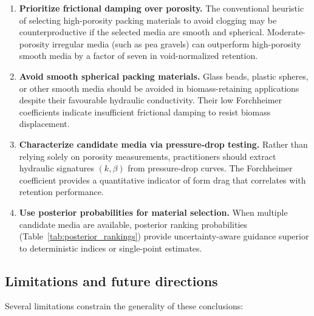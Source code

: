 \documentclass[12pt,a4paper]{article}
\begin{document}
\begin{enumerate}
    \item \textbf{Prioritize frictional damping over porosity.} The conventional heuristic of selecting high-porosity packing materials to avoid clogging may be counterproductive if the selected media are smooth and spherical. Moderate-porosity irregular media (such as pea gravels) can outperform high-porosity smooth media by a factor of seven in void-normalized retention.

    \item \textbf{Avoid smooth spherical packing materials.} Glass beads, plastic spheres, or other smooth media should be avoided in biomass-retaining applications despite their favourable hydraulic conductivity. Their low Forchheimer coefficients indicate insufficient frictional damping to resist biomass displacement.

    \item \textbf{Characterize candidate media via pressure-drop testing.} Rather than relying solely on porosity measurements, practitioners should extract hydraulic signatures $(k, \beta)$ from pressure-drop curves. The Forchheimer coefficient provides a quantitative indicator of form drag that correlates with retention performance.

    \item \textbf{Use posterior probabilities for material selection.} When multiple candidate media are available, posterior ranking probabilities (Table~\ref{tab:posterior_rankings}) provide uncertainty-aware guidance superior to deterministic indices or single-point estimates.
\end{enumerate}

\subsection{Limitations and future directions}
\label{sec:limitations}

Several limitations constrain the generality of these conclusions:
\end{document}
